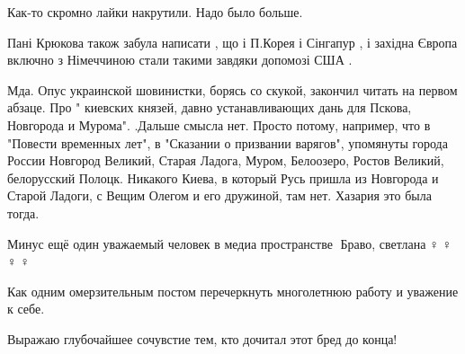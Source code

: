 \begin{itemize}
Как-то скромно лайки накрутили. Надо было больше.

 
Пані Крюкова також забула написати , що і П.Корея і Сінгапур , і західна Європа включно з Німеччиною стали такими завдяки допомозі США .

 

Мда. Опус украинской шовинистки, борясь со скукой, закончил читать на первом
абзаце. Про " киевских князей, давно устанавливающих дань для Пскова, Новгорода
и Мурома". .Дальше смысла нет. Просто потому, например, что в "Повести
временных лет", в "Сказании о призвании варягов", упомянуты города России
Новгород Великий, Старая Ладога, Муром, Белоозеро, Ростов Великий, белорусский
Полоцк. Никакого Киева, в который Русь пришла из Новгорода и Старой Ладоги, с
Вещим Олегом и его дружиной, там нет. Хазария это была тогда.


 
Минус ещё один уважаемый человек в медиа пространстве🤮 Браво, светлана🤦♀️🤦♀️🤦♀️🤦♀️

 
Как одним омерзительным постом перечеркнуть многолетнюю работу и уважение к себе.

 
Выражаю глубочайшее сочувстие тем, кто дочитал этот бред до конца!

 

\end{itemize}
